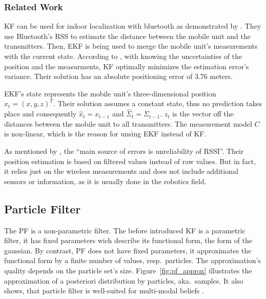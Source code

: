 \subsubsection*{Related Work}
\acs{KF} can be used for indoor localization with bluetooth as demonstrated by \citet{kotanen:exp_local_pos_bt}. They use Bluetooth's \acs{RSS} to estimate the distance between the mobile unit and the transmitters. Then, \acl{EKF} is being used to merge the mobile unit's measurements with the current state. According to \cite{kotanen:exp_local_pos_bt}, with knowing the uncertainties of the position and the measurments, \acs{KF} optimally minimizes the estimation error's variance. Their solution has an absolute positioning error of 3.76 meters.

\acs{EKF}'s state represents the mobile unit's three-dimensional position $x_t = (x, y, z)^T$. Their solution assumes a constant state, thus no prediction takes place and consequently $\hat{x}_t = x_{t-1}$ and $\hat{\Sigma}_t = \Sigma_{t-1}$. $z_t$ is the vector off the distances between the mobile unit to all transmitters. The measurement model $C$ is non-linear, which is the reason for unsing \acs{EKF} instead of \acs{KF}.

As mentioned by \citet{kotanen:exp_local_pos_bt}, the ``main source of errors is unreliability of \acs{RSSI}''. Their position estimation is based on filtered values instead of raw values. But in fact, it relies just on the wireless measurements and does not include additional sensors or information, as it is usually done in the robotics field.

\subsection{Particle Filter}\label{sec:fund_pf}
The \ac{PF} is a non-parametric filter. The before introduced \acs{KF} is a parametric filter, it has fixed parameters wich describe its functional form, the form of the gaussian. By contrast, \acs{PF} does not have fixed parameters, it approximates the functional form by a finite number of values, resp.\ particles. The approximation's quality depends on the particle set's size. Figure~\ref{fig:pf_approx} illustrates the approximation of a posteriori distribution by particles, aka.\ samples. It also shows, that particle filter is well-suited for multi-modal beliefs \citep{thrun:prob_robo}.


